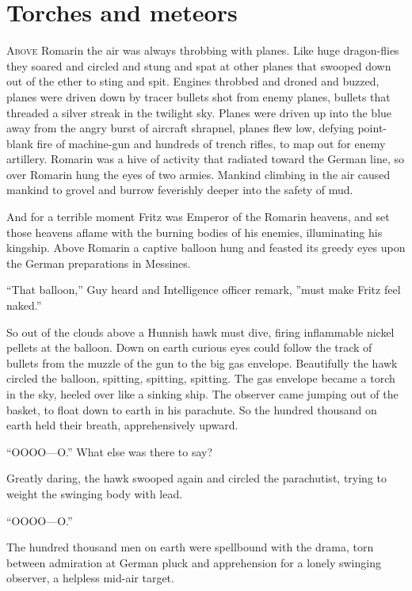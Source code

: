 \chapter*{\textsf{Torches and meteors}}

A\textsc{bove} Romarin the air was always throbbing with planes. Like huge dragon-flies they soared and circled and stung and spat at other planes that swooped down out of the ether to sting and spit. Engines throbbed and droned and buzzed, planes were driven down by tracer bullets shot from enemy planes, bullets that threaded a silver streak in the twilight sky. Planes were driven up into the blue away from the angry burst of aircraft shrapnel, planes flew low, defying point-blank fire of machine-gun and hundreds of trench rifles, to map out for enemy artillery. Romarin was a hive of activity that radiated toward the German line, so over Romarin hung the eyes of two armies. Mankind climbing in the air caused mankind to grovel and burrow feverishly deeper into the safety of mud.

And for a terrible moment Fritz was Emperor of the Romarin heavens, and set those heavens aflame with the burning bodies of his enemies, illuminating his kingship. Above Romarin a captive balloon hung and feasted its greedy eyes upon the German preparations in Messines.

``That balloon,'' Guy heard and Intelligence officer remark, ''must make Fritz feel naked.''

So out of the clouds above a Hunnish hawk must dive, firing inflammable nickel pellets at the balloon. Down on earth curious eyes could follow the track of bullets from the muzzle of the gun to the big gas envelope. Beautifully the hawk circled the balloon, spitting, spitting, spitting. The gas envelope became a torch in the sky, heeled over like a sinking ship. The observer came jumping out of the basket, to float down to earth in his parachute. So the hundred thousand on earth held their breath, apprehensively upward.

``OOOO---O.'' What else was there to say?

Greatly daring, the hawk swooped again and circled the parachutist, trying to weight the swinging body with lead.

``OOOO---O.''

The hundred thousand men on earth were spellbound with the drama, torn between admiration at German pluck and apprehension for a lonely swinging observer, a helpless mid-air target.

